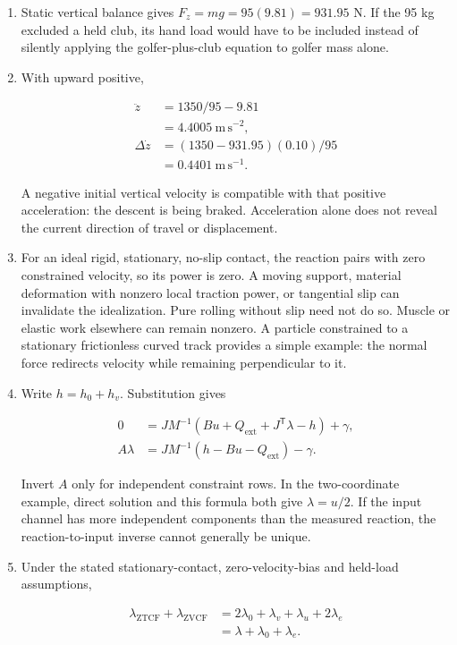 \begin{enumerate}
\def\labelenumi{\arabic{enumi}.}
\item
  Static vertical balance gives \(F_z=mg=95(9.81)=931.95\) N. If the 95 kg excluded a held club, its hand load would have to be included instead of silently applying the golfer-plus-club equation to golfer mass alone.
\item
  With upward positive,

  \[
  \begin{aligned}
  \ddot z&=1350/95-9.81\\
  &=4.4005\ \mathrm{m\,s^{-2}},\\
  \Delta\dot z&=(1350-931.95)(0.10)/95\\
  &=0.4401\ \mathrm{m\,s^{-1}}.
  \end{aligned}
  \]

  A negative initial vertical velocity is compatible with that positive acceleration: the descent is being braked. Acceleration alone does not reveal the current direction of travel or displacement.
\item
  For an ideal rigid, stationary, no-slip contact, the reaction pairs with zero constrained velocity, so its power is zero. A moving support, material deformation with nonzero local traction power, or tangential slip can invalidate the idealization. Pure rolling without slip need not do so. Muscle or elastic work elsewhere can remain nonzero. A particle constrained to a stationary frictionless curved track provides a simple example: the normal force redirects velocity while remaining perpendicular to it.
\item
  Write \(h=h_0+h_v\). Substitution gives

  \[
  \begin{aligned}
  0&=JM^{-1}(Bu+Q_{\mathrm{ext}}+J^\mathsf{T}\lambda-h)+\gamma,\\
  A\lambda&=JM^{-1}(h-Bu-Q_{\mathrm{ext}})-\gamma.
  \end{aligned}
  \]

  Invert \(A\) only for independent constraint rows. In the two-coordinate example, direct solution and this formula both give \(\lambda=u/2\). If the input channel has more independent components than the measured reaction, the reaction-to-input inverse cannot generally be unique.
\item
  Under the stated stationary-contact, zero-velocity-bias and held-load assumptions,

  \[
  \begin{aligned}
  \lambda_{\mathrm{ZTCF}}+\lambda_{\mathrm{ZVCF}}
  &=2\lambda_0+\lambda_v+\lambda_u+2\lambda_e\\
  &=\lambda+\lambda_0+\lambda_e.
  \end{aligned}
  \]


\end{enumerate}
